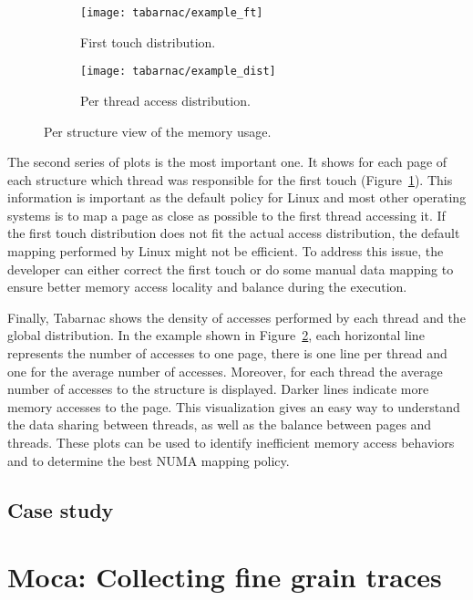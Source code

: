 \begin{figure}[htb]
    \centering
    \begin{subfigure}{.49\linewidth}
        \texttt{[image: tabarnac/example\_ft]}
        \caption{First touch distribution.}
        \label{fig:example_ft}
    \end{subfigure}
    \begin{subfigure}{.49\linewidth}
        \texttt{[image: tabarnac/example\_dist]}
        \caption{Per thread access distribution.}
        \label{fig:example_dist}
    \end{subfigure}
    \caption{Per structure view of the memory usage.}
    \label{fig:example_by_structs}
\end{figure}

The second series of plots is the most important one.
It shows for each page of each structure which thread was responsible for the first touch (Figure~\ref{fig:example_ft}).
This information is important as the default policy for \gls{Linux} and most other operating systems is to map a page as close as possible to the first thread accessing it.
If the first touch distribution does not fit the actual access distribution, the default mapping performed by \gls{Linux} might not be efficient.
To address this issue, the developer can either correct the first touch or do some manual data mapping to ensure better memory access locality and balance during the execution.

Finally, \gls{Tabarnac} shows the density of accesses performed by each thread and the global distribution.
In the example shown in Figure~\ref{fig:example_dist}, each horizontal line represents the number of accesses to one page, there is one line per thread and one for the average number of accesses.
Moreover, for each thread the average number of accesses to the structure is displayed.
Darker lines indicate more memory accesses to the page. This visualization gives an easy way to understand the data sharing between threads, as well as the balance between pages and
threads.
These plots can be used to identify inefficient memory access behaviors and to determine the best \gls{NUMA} mapping policy.

\subsection{Case study}



\section{Moca: Collecting fine grain traces}
\label{sec:Moca}

